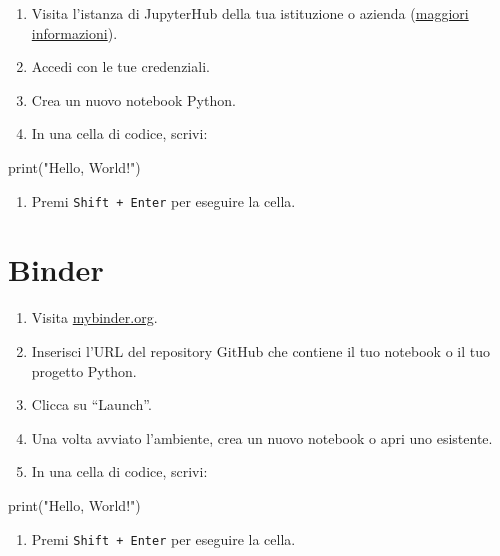 \documentclass[
  letterpaper,
]{scrbook}
\newenvironment{Shaded}{\begin{snugshade}}{\end{snugshade}}
\newcommand{\BuiltInTok}[1]{\textcolor[rgb]{0.00,0.23,0.31}{#1}}
\newcommand{\NormalTok}[1]{\textcolor[rgb]{0.00,0.23,0.31}{#1}}
\newcommand{\StringTok}[1]{\textcolor[rgb]{0.13,0.47,0.30}{#1}}
\providecommand{\tightlist}{%
  \setlength{\itemsep}{0pt}\setlength{\parskip}{0pt}}\usepackage{longtable,booktabs,array}
\begin{document}
\begin{enumerate}
\def\labelenumi{\arabic{enumi}.}
\tightlist
\item
  Visita l'istanza di JupyterHub della tua istituzione o azienda
  (\href{https://jupyter.org/hub}{maggiori informazioni}).
\item
  Accedi con le tue credenziali.
\item
  Crea un nuovo notebook Python.
\item
  In una cella di codice, scrivi:
\end{enumerate}

\begin{Shaded}
\begin{Highlighting}[]
\BuiltInTok{print}\NormalTok{(}\StringTok{"Hello, World!"}\NormalTok{)}
\end{Highlighting}
\end{Shaded}

\begin{enumerate}
\def\labelenumi{\arabic{enumi}.}
\setcounter{enumi}{4}
\tightlist
\item
  Premi \texttt{Shift\ +\ Enter} per eseguire la cella.
\end{enumerate}

\section{Binder}

\begin{enumerate}
\def\labelenumi{\arabic{enumi}.}
\tightlist
\item
  Visita \href{https://mybinder.org/}{mybinder.org}.
\item
  Inserisci l'URL del repository GitHub che contiene il tuo notebook o
  il tuo progetto Python.
\item
  Clicca su ``Launch''.
\item
  Una volta avviato l'ambiente, crea un nuovo notebook o apri uno
  esistente.
\item
  In una cella di codice, scrivi:
\end{enumerate}

\begin{Shaded}
\begin{Highlighting}[]
\BuiltInTok{print}\NormalTok{(}\StringTok{"Hello, World!"}\NormalTok{)}
\end{Highlighting}
\end{Shaded}

\begin{enumerate}
\def\labelenumi{\arabic{enumi}.}
\setcounter{enumi}{5}
\tightlist
\item
  Premi \texttt{Shift\ +\ Enter} per eseguire la cella.
\end{enumerate}
\end{document}
